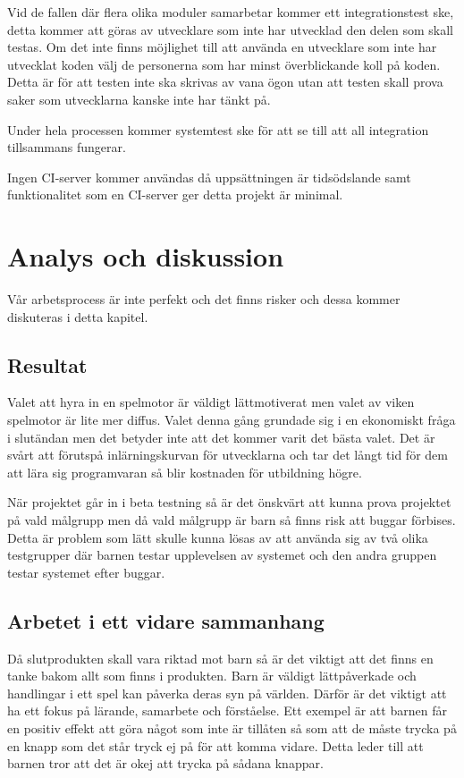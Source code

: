 \documentclass[a4paper,12pt,oneside,final]{extbook}
\begin{document}
Vid de fallen där flera olika moduler samarbetar kommer ett integrationstest ske, detta kommer att göras av utvecklare som inte har utvecklad den delen som skall testas. Om det inte finns möjlighet till att använda en utvecklare som inte har utvecklat koden välj de personerna som har minst överblickande koll på koden. Detta är för att testen inte ska skrivas av vana ögon utan att testen skall prova saker som utvecklarna kanske inte har tänkt på.

Under hela processen kommer systemtest ske för att se till att all integration tillsammans fungerar.

Ingen CI-server kommer användas då uppsättningen är tidsödslande samt funktionalitet som en CI-server ger detta projekt är minimal.


\chapter{Analys och diskussion}

Vår arbetsprocess är inte perfekt och det finns risker och dessa kommer diskuteras i detta kapitel.


\section{Resultat}
Valet att hyra in en spelmotor är väldigt lättmotiverat men valet av viken spelmotor är lite mer diffus. Valet denna gång grundade sig i en ekonomiskt fråga i slutändan men det betyder inte att det kommer varit det bästa valet. Det är svårt att förutspå inlärningskurvan för utvecklarna och tar det långt tid för dem att lära sig programvaran så blir kostnaden för utbildning högre. 

När projektet går in i beta testning så är det önskvärt att kunna prova projektet på vald målgrupp men då vald målgrupp är barn så finns risk att buggar förbises. Detta är problem som lätt skulle kunna lösas av att använda sig av två olika testgrupper där barnen testar upplevelsen av systemet och den andra gruppen testar systemet efter buggar.


\section{Arbetet i ett vidare sammanhang}

Då slutprodukten skall vara riktad mot barn så är det viktigt att det finns en tanke bakom allt som finns i produkten. Barn är väldigt lättpåverkade och handlingar i ett spel kan påverka deras syn på världen. Därför är det viktigt att ha ett fokus på lärande, samarbete och förståelse. Ett exempel är att barnen får en positiv effekt att göra något som inte är tillåten så som att de måste trycka på en knapp som det står tryck ej på för att komma vidare. Detta leder till att barnen tror att det är okej att trycka på sådana knappar.
\end{document}
